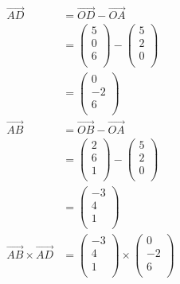 \documentclass[12pt]{article}
\newenvironment{problem}[2][Problem]{\begin{trivlist}
\item[\hskip \labelsep {\bfseries #1}\hskip \labelsep {\bfseries #2.}]}{\end{trivlist}}
\begin{document}
\begin{problem}{4}
\end{problem}
\begin{align*}
\vec{AD} &= \vec{OD} - \vec{OA} \\
&= 
\left( \begin{array}{c}
	5\\
	0\\
	6\\
\end{array} \right)
-
\left( \begin{array}{c}
	5\\
	2\\
	0\\
\end{array} \right)\\
&=
\left( \begin{array}{c}
	0\\
	-2\\
	6\\
\end{array} \right)\\
\vec{AB} &= \vec{OB} - \vec{OA} \\
&= 
\left( \begin{array}{c}
	2\\
	6\\
	1\\
\end{array} \right)
-
\left( \begin{array}{c}
	5\\
	2\\
	0\\
\end{array} \right)\\
&=
\left( \begin{array}{c}
	-3\\
	4\\
	1\\
\end{array} \right)\\
\vec{AB} \times \vec{AD}
&= 
\left( \begin{array}{c}
	-3\\
	4\\
	1\\
\end{array} \right) 
\times
\left( \begin{array}{c}
	0\\
	-2\\
	6\\
\end{array} \right)\\

\end{align*}
\end{document}
